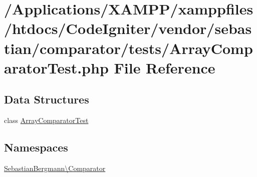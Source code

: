 \hypertarget{_array_comparator_test_8php}{}\section{/\+Applications/\+X\+A\+M\+P\+P/xamppfiles/htdocs/\+Code\+Igniter/vendor/sebastian/comparator/tests/\+Array\+Comparator\+Test.php File Reference}
\label{_array_comparator_test_8php}
\subsection*{Data Structures}
\begin{DoxyCompactItemize}
\item 
class \mbox{\hyperlink{class_sebastian_bergmann_1_1_comparator_1_1_array_comparator_test}{Array\+Comparator\+Test}}
\end{DoxyCompactItemize}
\subsection*{Namespaces}
\begin{DoxyCompactItemize}
\item 
 \mbox{\hyperlink{namespace_sebastian_bergmann_1_1_comparator}{Sebastian\+Bergmann\textbackslash{}\+Comparator}}
\end{DoxyCompactItemize}
